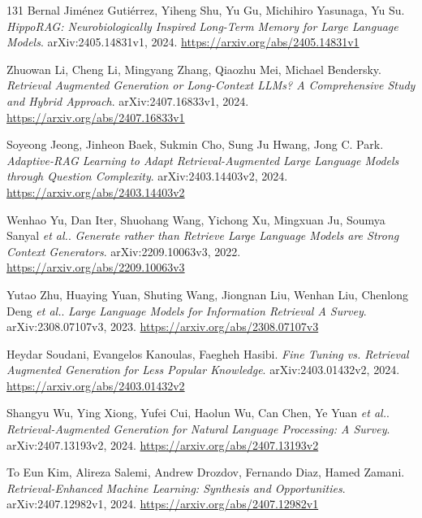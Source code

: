 \documentclass[11pt,a4paper]{article}
\begin{document}
\begin{thebibliography}{131}
Bernal Jim\'{e}nez Guti\'{e}rrez, Yiheng Shu, Yu Gu, Michihiro Yasunaga, Yu Su.
\newblock \emph{HippoRAG: Neurobiologically Inspired Long-Term Memory for Large Language Models}.
\newblock arXiv:2405.14831v1, 2024.
\newblock \url{https://arxiv.org/abs/2405.14831v1}

Zhuowan Li, Cheng Li, Mingyang Zhang, Qiaozhu Mei, Michael Bendersky.
\newblock \emph{Retrieval Augmented Generation or Long-Context LLMs? A Comprehensive Study and Hybrid Approach}.
\newblock arXiv:2407.16833v1, 2024.
\newblock \url{https://arxiv.org/abs/2407.16833v1}

Soyeong Jeong, Jinheon Baek, Sukmin Cho, Sung Ju Hwang, Jong C. Park.
\newblock \emph{Adaptive-RAG Learning to Adapt Retrieval-Augmented Large Language Models through Question Complexity}.
\newblock arXiv:2403.14403v2, 2024.
\newblock \url{https://arxiv.org/abs/2403.14403v2}

Wenhao Yu, Dan Iter, Shuohang Wang, Yichong Xu, Mingxuan Ju, Soumya Sanyal \emph{et al.}.
\newblock \emph{Generate rather than Retrieve Large Language Models are Strong Context Generators}.
\newblock arXiv:2209.10063v3, 2022.
\newblock \url{https://arxiv.org/abs/2209.10063v3}

Yutao Zhu, Huaying Yuan, Shuting Wang, Jiongnan Liu, Wenhan Liu, Chenlong Deng \emph{et al.}.
\newblock \emph{Large Language Models for Information Retrieval A Survey}.
\newblock arXiv:2308.07107v3, 2023.
\newblock \url{https://arxiv.org/abs/2308.07107v3}

Heydar Soudani, Evangelos Kanoulas, Faegheh Hasibi.
\newblock \emph{Fine Tuning vs. Retrieval Augmented Generation for Less Popular Knowledge}.
\newblock arXiv:2403.01432v2, 2024.
\newblock \url{https://arxiv.org/abs/2403.01432v2}

Shangyu Wu, Ying Xiong, Yufei Cui, Haolun Wu, Can Chen, Ye Yuan \emph{et al.}.
\newblock \emph{Retrieval-Augmented Generation for Natural Language Processing: A Survey}.
\newblock arXiv:2407.13193v2, 2024.
\newblock \url{https://arxiv.org/abs/2407.13193v2}

To Eun Kim, Alireza Salemi, Andrew Drozdov, Fernando Diaz, Hamed Zamani.
\newblock \emph{Retrieval-Enhanced Machine Learning: Synthesis and Opportunities}.
\newblock arXiv:2407.12982v1, 2024.
\newblock \url{https://arxiv.org/abs/2407.12982v1}


\end{thebibliography}
\end{document}
